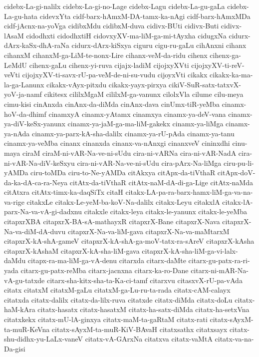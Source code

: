 {cidebx-La-gi-nalilx
cidebx-La-gi-no-Lage
cidebx-Lagu
cidebx-La-gu-gaLa
cidebx-La-gu-hata
cidevxYta
cidf-barx-hAmxM-DA-tamx-ka-nAgi
cidf-barx-hAmxMDa
cidf-jAcnx-na-yoVga
cidibxMdu
cidibxM-duva
cidivx-BUti
cidivx-Buti
cidivx-lAsaM
cidodhxti
cidodhxtiH
cidovxyXV-ma-liM-ga-mi-tAyxha
cidugxNa
cidurx-dArx-kaSx-dhA-raNa
cidurx-dArx-kiSxya
ciguru
cigu-ru-gaLu
cihAnxni
cihanx
cihanxM
cihanxM-ga-LiM-te-nonx-Lire
cihanx-veM-da-ridu
cihenx
cihenx-ga-LeMdU
cihenx-gaLu
cihenx-yi-ruva
cijajx-ladiM
cijojxyXVti
cijojxyXV-ti-reV-veVti
cijojxyXV-ti-savx-rU-pa-veM-de-ni-su-vudu
cijoyxVti
cikakx
cikakx-ka-ma-la-ga-Lanunx
cikakx-vAyx-pitxdu
cikakx-yayx-pirxya
cikiV-SuR-satx-tatxvX-yoV-ja-namf
cikitesx
cililxMgaM
cililxM-ga-vanunx
cilolxVla
cilume
cilu-meya
cimu-kisi
cinAnxda
cinAnx-da-diMda
cinAnx-dava
cinUmx-tiR-yeMba
cinamx-hoV-da-dhimf
cinamxyA
cinamx-yAtamx
cinamxya
cinamx-ya-deV-vana
cinamx-ya-diV-keSx-yanunx
cinamx-ya-jaM-ga-ma-liM-gakekx
cinamx-ya-liMga
cinamx-ya-nAda
cinamx-ya-parx-kA-sha-dalilx
cinamx-ya-rU-pAda
cinamx-ya-tanu
cinamx-ya-veMba
cinanx
cinanxda
cinanx-va-nAnxgi
cinanxveV
cininxdhi
cinu-maya
ciraM
ciraM-ni-vAR-Na-ve-ni-sUdu
cira-ni-vARNa
cira-ni-vAR-NadA
cira-ni-vAR-Na-diV-keSxyu
cira-ni-vAR-Na-ve-ni-sUdu
cira-pArx-Na-liMga
ciru-pu-li-yAMDa
ciru-toMDa
ciru-to-Ne-yAMDa
citAkxya
citApx-da-tiVthaR
citApx-doV-da-ka-dA-ca-ra-Neya
citAtx-da-tiVthaR
citAtx-naM-dA-di-ga-Lige
citAtx-naMda
citAtxra
citAtx-timx-ka-daqSiTx
citaH
citakx-LA-pa-ra-barx-hamx-liM-ga-va-na-va-rige
citakxLe
citakx-Le-yeM-ba-koV-Na-dalilx
citakx-Leyu
citakxlA
citakx-lA-parx-Na-va-vA-gi-dadxnu
citakxle
citakx-leya
citakx-le-yanunx
citakx-le-yeMba
citapxrXBA
citapxrX-BA-sA-mathayxR
citapxrX-Bane
citapxrX-Nava
citapxrX-Na-va-diM-dA-duvu
citapxrX-Na-va-liM-gava
citapxrX-Na-va-maMtarxM
citapxrX-kA-shA-gameV
citapxrX-kA-shA-ga-moV-tatx-ra-sAreV
citapxrX-kAsha
citapxrX-kAshaM
citapxrX-kA-sha-liM-gava
citapxrX-kA-sha-liM-ga-vi-lalx-daMdu
citapx-ra-ma-liM-ga-vA-denu
citarxda
citarx-daMte
citarx-gu-patx-ra-ri-yada
citarx-gu-patx-reMba
citarx-jacnxna
citarx-ka-ro-Dane
citarx-ni-mAR-Na-vA-gu-tatxde
citarx-sha-kitx-sha-ta-Ka-ci-tamf
citarxvu
citasxvX-rU-pa-vAda
citatx
citatxM
citatxM-gaLu
citatxM-ga-Lu-ru-ta-rada
citatx-cAM-calayx
citatxda
citatx-dalilx
citatx-da-lilx-ruva
citatxde
citatx-diMda
citatx-doLu
citatx-haM-kAra
citatx-hasatx
citatx-hasatxM
citatx-ha-satx-diMda
citatx-ha-setxVna
citatxkekx
citatx-mU-lA-ginxya
citatx-maM-ta-gaRtaM
citatx-rati
citatx-sAyxM-ta-muR-KeVna
citatx-sAyxM-ta-muR-KiV-BAvaH
citatxsathx
citatxsayx
citatx-shu-didhx-yu-LaLx-vaneV
citatx-vA-GArxNa
citatxva
citatx-vaMtA
citatx-va-na-Da-gisi
}

